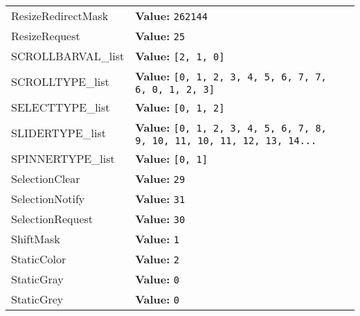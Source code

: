\begin{longtable}{|p{\varnamewidth}|p{\vardescrwidth}|l}
\cline{1-2}
\raggedright R\-e\-s\-i\-z\-e\-R\-e\-d\-i\-r\-e\-c\-t\-M\-a\-s\-k\- & \raggedright \textbf{Value:} 
{\tt 262144}&\\
\cline{1-2}
\raggedright R\-e\-s\-i\-z\-e\-R\-e\-q\-u\-e\-s\-t\- & \raggedright \textbf{Value:} 
{\tt 25}&\\
\cline{1-2}
\raggedright S\-C\-R\-O\-L\-L\-B\-A\-R\-V\-A\-L\-\_\-l\-i\-s\-t\- & \raggedright \textbf{Value:} 
{\tt \texttt{[}2\texttt{, }1\texttt{, }0\texttt{]}}&\\
\cline{1-2}
\raggedright S\-C\-R\-O\-L\-L\-T\-Y\-P\-E\-\_\-l\-i\-s\-t\- & \raggedright \textbf{Value:} 
{\tt \texttt{[}0\texttt{, }1\texttt{, }2\texttt{, }3\texttt{, }4\texttt{, }5\texttt{, }6\texttt{, }7\texttt{, }7\texttt{, }6\texttt{, }0\texttt{, }1\texttt{, }2\texttt{, }3\texttt{]}}&\\
\cline{1-2}
\raggedright S\-E\-L\-E\-C\-T\-T\-Y\-P\-E\-\_\-l\-i\-s\-t\- & \raggedright \textbf{Value:} 
{\tt \texttt{[}0\texttt{, }1\texttt{, }2\texttt{]}}&\\
\cline{1-2}
\raggedright S\-L\-I\-D\-E\-R\-T\-Y\-P\-E\-\_\-l\-i\-s\-t\- & \raggedright \textbf{Value:} 
{\tt \texttt{[}0\texttt{, }1\texttt{, }2\texttt{, }3\texttt{, }4\texttt{, }5\texttt{, }6\texttt{, }7\texttt{, }8\texttt{, }9\texttt{, }10\texttt{, }11\texttt{, }10\texttt{, }11\texttt{, }12\texttt{, }13\texttt{, }14\texttt{...}}&\\
\cline{1-2}
\raggedright S\-P\-I\-N\-N\-E\-R\-T\-Y\-P\-E\-\_\-l\-i\-s\-t\- & \raggedright \textbf{Value:} 
{\tt \texttt{[}0\texttt{, }1\texttt{]}}&\\
\cline{1-2}
\raggedright S\-e\-l\-e\-c\-t\-i\-o\-n\-C\-l\-e\-a\-r\- & \raggedright \textbf{Value:} 
{\tt 29}&\\
\cline{1-2}
\raggedright S\-e\-l\-e\-c\-t\-i\-o\-n\-N\-o\-t\-i\-f\-y\- & \raggedright \textbf{Value:} 
{\tt 31}&\\
\cline{1-2}
\raggedright S\-e\-l\-e\-c\-t\-i\-o\-n\-R\-e\-q\-u\-e\-s\-t\- & \raggedright \textbf{Value:} 
{\tt 30}&\\
\cline{1-2}
\raggedright S\-h\-i\-f\-t\-M\-a\-s\-k\- & \raggedright \textbf{Value:} 
{\tt 1}&\\
\cline{1-2}
\raggedright S\-t\-a\-t\-i\-c\-C\-o\-l\-o\-r\- & \raggedright \textbf{Value:} 
{\tt 2}&\\
\cline{1-2}
\raggedright S\-t\-a\-t\-i\-c\-G\-r\-a\-y\- & \raggedright \textbf{Value:} 
{\tt 0}&\\
\cline{1-2}
\raggedright S\-t\-a\-t\-i\-c\-G\-r\-e\-y\- & \raggedright \textbf{Value:} 
{\tt 0}&\\

\end{longtable}
